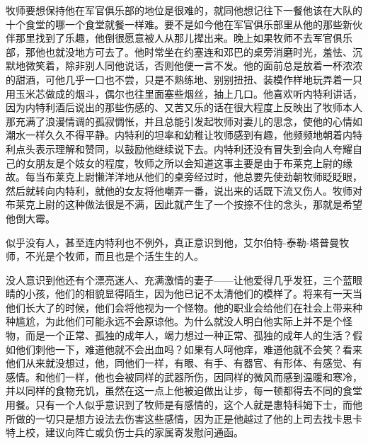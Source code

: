     牧师要想保持他在军官俱乐部的地位是很难的，就同他想记往下一餐他该在大队的十个食堂的哪一个食堂就餐一样难。要不是如今他在军官俱乐部里从他的那些新伙伴那里找到了乐趣，他倒很愿意被人从那儿撵出来。晚上如果牧师不去军官俱乐部，那他也就没地方可去了。他时常坐在约塞连和邓巴的桌旁消磨时光，羞怯、沉默地微笑着，除非别人同他说话，否则他便一言不发。他的面前总是放着一杯浓浓的甜酒，可他几乎一口也不尝，只是不熟练地、别别扭扭、装模作样地玩弄着一只用玉米芯做成的烟斗，偶尔也往里面塞些烟丝，抽上几口。他喜欢听内特利讲话，因为内特利酒后说出的那些伤感的、又苦又乐的话在很大程度上反映出了牧师本人那充满了浪漫情调的孤寂惆怅，并且总能引发起牧师对妻儿的思念，使他的心情如潮水一样久久不得平静。内特利的坦率和幼稚让牧师感到有趣，他频频地朝着内特利点头表示理解和赞同，以鼓励他继续说下去。内特利还没有冒失到会向人夸耀自己的女朋友是个妓女的程度，牧师之所以会知道这事主要是由于布莱克上尉的缘故。每当布莱克上尉懒洋洋地从他们的桌旁经过时，他总要先使劲朝牧师眨眨眼，然后就转向内特利，就他的女友将他嘲弄一番，说出来的话既下流又伤人。牧师对布莱克上尉的这种做法很是不满，因此就产生了一个按捺不住的念头，那就是希望他倒大霉。

 


    似乎没有人，甚至连内特利也不例外，真正意识到他，艾尔伯特-泰勒-塔普曼牧师，不光是个牧师，而且也是个活生生的人。

    没人意识到他还有个漂亮迷人、充满激情的妻子——让他爱得几乎发狂，三个蓝眼睛的小孩，他们的相貌显得陌生，因为他已记不太清他们的模样了。将来有一天当他们长大了的时候，他们会将他视为一个怪物。他的职业会给他们在社会上带来种种尴尬，为此他们可能永远不会原谅他。为什么就没人明白他实际上并不是个怪物，而是一个正常、孤独的成年人，竭力想过一种正常、孤独的成年人的生活？假如他们刺他一下，难道他就不会出血吗？如果有人呵他痒，难道他就不会笑？看来他们从来就没想过，他，同他们一样，有眼、有手、有器官、有形体、有感觉、有感情。和他们一样，他也会被同样的武器所伤，因同样的微风而感到温暖和寒冷，并以同样的食物充饥，虽然在这一点上他被迫做出让步，每一顿都得去不同的食堂用餐。只有一个人似乎意识到了牧师是有感情的，这个人就是惠特科姆下士，而他所做的一切只是想方设法去伤害这些感情，因为正是他越过了他的上司去找卡思卡特上校，建议向阵亡或负伤士兵的家属寄发慰问通函。

